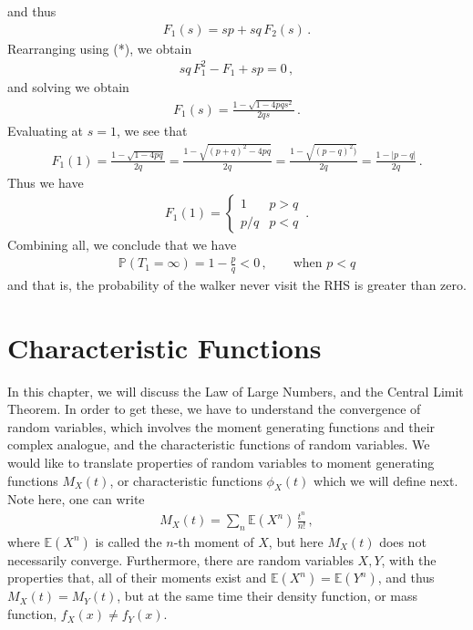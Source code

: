 \documentclass[11pt, onesided]{book}
\theoremstyle{break}
\theoremstyle{break}
\begin{document}
and thus
\begin{align*}
F_1(s) = sp + sq\, F_2(s)\,.
\end{align*}
Rearranging using (*), we obtain
\begin{align*}
sq\, F_1^2 - F_1 + sp = 0\,,
\end{align*}
and solving we obtain
\begin{align*}
F_1(s) = \frac{1 - \sqrt{1-4pqs^2}}{2qs}\,. 
\end{align*}
Evaluating at $s= 1$, we see that
\begin{align*}
F_1(1) = \frac{1 - \sqrt{1-4pq}}{2q} = \frac{1-\sqrt{(p + q)^2 - 4pq}}{2q} = \frac{1-\sqrt{(p-q)^2)}}{2q} = \frac{1-|p-q|}{2q}\,.
\end{align*}
Thus we have
\begin{align*}
F_1(1) = \begin{cases}
1 & p>q\\
p/q & p<q
\end{cases}\,.
\end{align*}
Combining all, we conclude that we have
\begin{align*}
\mathbb{P}(T_1 = \infty) = 1- \frac{p}{q}<0 \,,\qquad \text{when }p<q
\end{align*}
and that is, the probability of the walker never visit the RHS is greater than zero. \\

\section[Characteristic Functions]{\color{red}Characteristic Functions\color{black}}
In this chapter, we will discuss the Law of Large Numbers, and the Central Limit Theorem. In order to get these, we have to understand the convergence of random variables, which involves the moment generating functions and their complex analogue, and the characteristic functions of random variables. We would like to translate properties of random variables to moment generating functions $M_X(t)$, or characteristic functions $\phi_X(t)$ which we will define next. \\

Note here, one can write
\begin{align*}
M_X(t) = \sum_n \mathbb{E}(X^n)\, \frac{t^n}{n!}\,,
\end{align*}
where $\mathbb{E}(X^n)$ is called the $n$-th moment of $X$, but here $M_X(t)$ does not necessarily converge. Furthermore, there are random variables $X,Y$, with the properties that, all of their moments exist and $\mathbb{E}(X^n) = \mathbb{E}(Y^n)$, and thus $M_X(t) = M_Y(t)$, but at the same time their density function, or mass function, $f_X(x) \neq f_Y(x)$. \\
\end{document}
